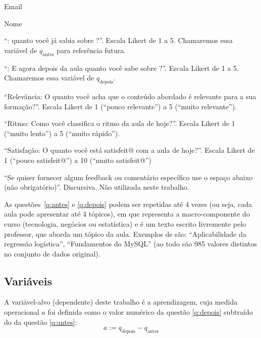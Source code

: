 \begin{compactenum}
	\item Email
	
	\item Nome
	
	\item\label{q:antes} ``: quanto você já sabia sobre ?''.
	Escala Likert de 1 a 5.
	Chamaremos essa variável de $q_\text{antes}$ para referência futura.
	
	\item\label{q:depois} ``: E agora depois da aula quanto você sabe sobre ?''.
	Escala Likert de 1 a 5.
	Chamaremos essa variável de $q_\text{depois}$.
	
	\item\label{q:relevancia} ``Relevância: O quanto você acha que o conteúdo abordado é relevante para a sua formação?''. Escala Likert de 1 (``pouco relevante'') a 5 (``muito relevante'').
	
	\item\label{q:ritmo} ``Ritmo: Como você classifica o ritmo da aula de hoje?''. Escala Likert de 1 (``muito lento'') a 5 (``muito rápido'').
	
	\item\label{q:satisfação} ``Satisfação: O quanto você está satisfeit@ com a aula de hoje?''.
	Escala Likert de 1 (``pouco satisfeit@'') a 10 (``muito satisfeit@'')
	
	\item ``Se quiser fornecer algum feedback ou comentário específico use o espaço abaixo (não obrigatório)''.
	Discursiva.
	Não utilizada neste trabalho.
\end{compactenum}

As questões~\ref{q:antes} e \ref{q:depois} podem ser repetidas até 4 vezes (ou seja, cada aula pode apresentar até 4 tópicos), em que  representa a macro-componente do curso (tecnologia, negócios ou estatística) e  é um texto escrito livremente pelo professor, que aborda um tópico da aula.
Exemplos de  são: ``Aplicabilidade da regressão logística'', ``Fundamentos do MySQL'' \etc (ao todo são 985 valores distintos no conjunto de dados original).

\subsection{Variáveis}

A variável-alvo (dependente) deste trabalho é a aprendizagem, cuja medida operacional $a$ foi definida como o valor numérico da questão \ref{q:depois} subtraído do da questão \ref{q:antes}:
\begin{equation}\label{eq:a}
	a := q_\text{depois} - q_\text{antes}
\end{equation}

